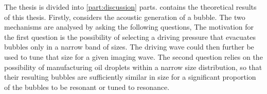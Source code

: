 The thesis is divided into \ref{part:discussion} parts.
%
%
%
%
%
 contains the theoretical results of this thesis.
Firstly,  considers the acoustic generation of a bubble.
The two mechanisms are analysed by asking the following questions,
The motivation for the first question is the possibility 
of selecting a driving pressure that evacuates bubbles only in a narrow band of sizes.
The driving wave could then further be used to tune that size for a given imaging wave.
The second question relies on the possibility of manufacturing oil droplets
within a narrow size distribution, 
so that their resulting bubbles are sufficiently similar in size 
for a significant proportion of the bubbles to be resonant or tuned to resonance.

